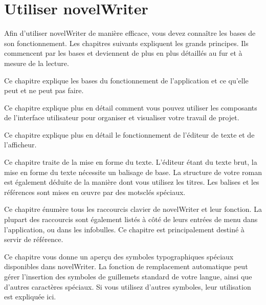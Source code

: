 \documentclass[a4paper,11pt,french]{sphinxmanual}
\begin{document}
\section{Utiliser novelWriter}
\label{\detokenize{int_overview:using-novelwriter}}
\sphinxAtStartPar
Afin d’utiliser novelWriter de manière efficace, vous devez connaître les bases de son fonctionnement. Les chapitres suivants expliquent les grands principes. Ils commencent par les bases et deviennent de plus en plus détaillés au fur et à mesure de la lecture.
\begin{description}
\sphinxAtStartPar
Ce chapitre explique les bases du fonctionnement de l’application et ce qu’elle peut et ne peut pas faire.

\sphinxAtStartPar
Ce chapitre explique plus en détail comment vous pouvez utiliser les composants de l’interface utilisateur pour organiser et visualiser votre travail de projet.

\sphinxAtStartPar
Ce chapitre explique plus en détail le fonctionnement de l’éditeur de texte et de l’afficheur.

\sphinxAtStartPar
Ce chapitre traite de la mise en forme du texte. L’éditeur étant du texte brut, la mise en forme du texte nécessite un balisage de base. La structure de votre roman est également déduite de la manière dont vous utilisez les titres. Les balises et les références sont mises en œuvre par des mots\sphinxhyphen{}clés spéciaux.

\sphinxAtStartPar
Ce chapitre énumère tous les raccourcis clavier de novelWriter et leur fonction. La plupart des raccourcis sont également listés à côté de leurs entrées de menu dans l’application, ou dans les info\sphinxhyphen{}bulles. Ce chapitre est principalement destiné à servir de référence.

\sphinxAtStartPar
Ce chapitre vous donne un aperçu des symboles typographiques spéciaux disponibles dans novelWriter. La fonction de remplacement automatique peut gérer l’insertion des symboles de guillemets standard de votre langue, ainsi que d’autres caractères spéciaux. Si vous utilisez d’autres symboles, leur utilisation est expliquée ici.

\end{description}
\end{document}
